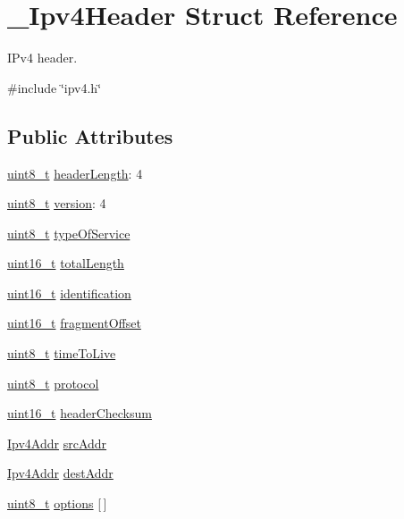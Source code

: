\hypertarget{struct__Ipv4Header}{}\section{\+\_\+\+Ipv4\+Header Struct Reference}
\label{struct__Ipv4Header}


I\+Pv4 header.  




{\ttfamily \#include \char`\"{}ipv4.\+h\char`\"{}}

\subsection*{Public Attributes}
\begin{DoxyCompactItemize}
\item 
\hyperlink{stdint_8h_aba7bc1797add20fe3efdf37ced1182c5}{uint8\+\_\+t} \hyperlink{struct__Ipv4Header_a506650285232d83505d5e7fe2badf912}{header\+Length}\+: 4
\item 
\hyperlink{stdint_8h_aba7bc1797add20fe3efdf37ced1182c5}{uint8\+\_\+t} \hyperlink{struct__Ipv4Header_aefb3451dde5ac0d27d7a7b90e4040d70}{version}\+: 4
\item 
\hyperlink{stdint_8h_aba7bc1797add20fe3efdf37ced1182c5}{uint8\+\_\+t} \hyperlink{struct__Ipv4Header_a9724ebee6b537157d5b8e735bdb3aa70}{type\+Of\+Service}
\item 
\hyperlink{stdint_8h_a273cf69d639a59973b6019625df33e30}{uint16\+\_\+t} \hyperlink{struct__Ipv4Header_ac7b0c8cf9e952b36e2ead5389f260f9f}{total\+Length}
\item 
\hyperlink{stdint_8h_a273cf69d639a59973b6019625df33e30}{uint16\+\_\+t} \hyperlink{struct__Ipv4Header_ab002286efcfac75b6e92264b55d794f2}{identification}
\item 
\hyperlink{stdint_8h_a273cf69d639a59973b6019625df33e30}{uint16\+\_\+t} \hyperlink{struct__Ipv4Header_ac6b4c00b707af577d45e6dd5afccd54a}{fragment\+Offset}
\item 
\hyperlink{stdint_8h_aba7bc1797add20fe3efdf37ced1182c5}{uint8\+\_\+t} \hyperlink{struct__Ipv4Header_a3cf70b8027490b5b6f90c225d7bd2946}{time\+To\+Live}
\item 
\hyperlink{stdint_8h_aba7bc1797add20fe3efdf37ced1182c5}{uint8\+\_\+t} \hyperlink{struct__Ipv4Header_aa32a265fce309986adbeb3710d833638}{protocol}
\item 
\hyperlink{stdint_8h_a273cf69d639a59973b6019625df33e30}{uint16\+\_\+t} \hyperlink{struct__Ipv4Header_a82cbdc6a7da141c30e4a03492470ab0b}{header\+Checksum}
\item 
\hyperlink{ipv4_8h_a411debb3d770caa0c06d3f73367da37f}{Ipv4\+Addr} \hyperlink{struct__Ipv4Header_a5016c85d79e8e81afd5f943a2f84ba17}{src\+Addr}
\item 
\hyperlink{ipv4_8h_a411debb3d770caa0c06d3f73367da37f}{Ipv4\+Addr} \hyperlink{struct__Ipv4Header_ab91a908398b8cbcfb79ac5326047a2c5}{dest\+Addr}
\item 
\hyperlink{stdint_8h_aba7bc1797add20fe3efdf37ced1182c5}{uint8\+\_\+t} \hyperlink{struct__Ipv4Header_a64b8877771d8051a24db4a030c12abee}{options} \mbox{[}$\,$\mbox{]}
\end{DoxyCompactItemize}


